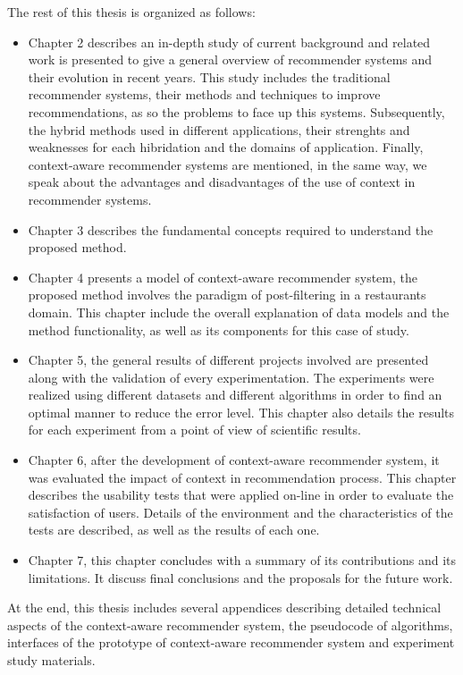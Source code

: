 The rest of this thesis is organized as follows: 
\begin{itemize}  
\item Chapter 2 describes an in-depth study of current background and
related work is presented to give a general overview of recommender
systems and their evolution in recent years. This study includes the
traditional recommender systems, their methods and techniques to
improve recommendations, as so the problems to face up this systems.
Subsequently, the hybrid methods used in different applications, their
strenghts and weaknesses for each hibridation and the domains of
application. Finally, context-aware recommender systems are mentioned,
in the same way, we speak about the advantages and disadvantages of
the use of context in recommender systems.
\item Chapter 3 describes the fundamental concepts required to
understand the proposed method.
\item Chapter 4 presents a model of context-aware recommender system,
the proposed method  involves the paradigm of post-filtering in a restaurants
domain. This chapter include the overall explanation of data models and 
the method functionality, as well as its components for this case of study.
\item Chapter 5, the general results of different projects involved
are presented along with the validation of every experimentation. The
experiments were realized using different datasets and different
algorithms in order to find an optimal manner to reduce the error
level. This chapter also details the results for each experiment 
from a point of view of scientific results.
\item Chapter 6, after the development of context-aware recommender
system, it was evaluated the impact of context
in recommendation process. This chapter describes the usability tests
that were applied on-line in order to evaluate the satisfaction of
users. Details of the environment and the characteristics of the tests
are described, as well as the results of each one.
\item Chapter 7, this chapter concludes with a
summary of its contributions and  its limitations. It discuss final
conclusions and the proposals for the future work.
\end{itemize}  
At the end, this thesis includes several appendices describing
detailed technical aspects of the context-aware recommender system,
the pseudocode of algorithms, interfaces of the prototype of 
context-aware recommender system and experiment study
materials.



